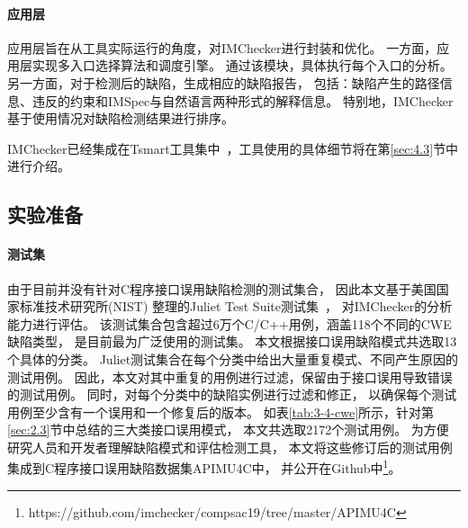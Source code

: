 \paragraph{应用层}
应用层旨在从工具实际运行的角度，对IMChecker进行封装和优化。
一方面，应用层实现多入口选择算法和调度引擎。
通过该模块，具体执行每个入口的分析。
另一方面，对于检测后的缺陷，生成相应的缺陷报告，
包括：缺陷产生的路径信息、违反的约束和IMSpec与自然语言两种形式的解释信息。
特别地，IMChecker基于使用情况对缺陷检测结果进行排序。

IMChecker已经集成在Tsmart工具集中~\cite{tsmart}，工具使用的具体细节将在第\ref{sec:4.3}节中进行介绍。

\subsection{实验准备}



\paragraph{测试集} 
由于目前并没有针对C程序接口误用缺陷检测的测试集合，
因此本文基于美国国家标准技术研究所(NIST) 整理的Juliet Test Suite测试集~\cite{juliet}，
对IMChecker的分析能力进行评估。
该测试集合包含超过6万个C/C++用例，涵盖118个不同的CWE缺陷类型，
是目前最为广泛使用的测试集。
本文根据接口误用缺陷模式共选取13个具体的分类。
Juliet测试集合在每个分类中给出大量重复模式、不同产生原因的测试用例。
因此，本文对其中重复的用例进行过滤，保留由于接口误用导致错误的测试用例。
同时，对每个分类中的缺陷实例进行过滤和修正，
以确保每个测试用例至少含有一个误用和一个修复后的版本。
如表\ref{tab:3-4-cwe}所示，针对第\ref{sec:2.3}节中总结的三大类接口误用模式，
本文共选取2172个测试用例。
为方便研究人员和开发者理解缺陷模式和评估检测工具，
本文将这些修订后的测试用例集成到C程序接口误用缺陷数据集APIMU4C中，
并公开在Github中\footnote{https://github.com/imchecker/compsac19/tree/master/APIMU4C}。


